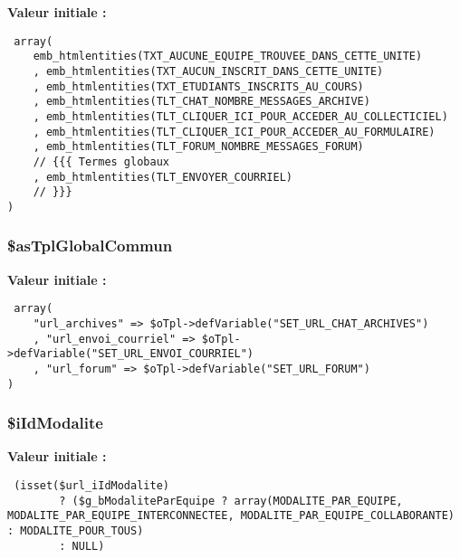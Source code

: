 \textbf{Valeur initiale :}

\begin{Code}\begin{verbatim} array(
    emb_htmlentities(TXT_AUCUNE_EQUIPE_TROUVEE_DANS_CETTE_UNITE)
    , emb_htmlentities(TXT_AUCUN_INSCRIT_DANS_CETTE_UNITE)
    , emb_htmlentities(TXT_ETUDIANTS_INSCRITS_AU_COURS)
    , emb_htmlentities(TLT_CHAT_NOMBRE_MESSAGES_ARCHIVE)
    , emb_htmlentities(TLT_CLIQUER_ICI_POUR_ACCEDER_AU_COLLECTICIEL)
    , emb_htmlentities(TLT_CLIQUER_ICI_POUR_ACCEDER_AU_FORMULAIRE)
    , emb_htmlentities(TLT_FORUM_NOMBRE_MESSAGES_FORUM)
    // {{{ Termes globaux
    , emb_htmlentities(TLT_ENVOYER_COURRIEL)
    // }}}
)
\end{verbatim}
\end{Code}
\subsubsection{\setlength{\rightskip}{0pt plus 5cm}\$asTplGlobalCommun}\label{tableau__bord_8php_5397d2056f6d0551fd87e3cb2b918a30}


\textbf{Valeur initiale :}

\begin{Code}\begin{verbatim} array(
    "url_archives" => $oTpl->defVariable("SET_URL_CHAT_ARCHIVES")
    , "url_envoi_courriel" => $oTpl->defVariable("SET_URL_ENVOI_COURRIEL")
    , "url_forum" => $oTpl->defVariable("SET_URL_FORUM")
)
\end{verbatim}
\end{Code}
\subsubsection{\setlength{\rightskip}{0pt plus 5cm}\$iIdModalite}\label{tableau__bord_8php_8ffd5d58fcf7816f84524b458f8adb5d}


\textbf{Valeur initiale :}

\begin{Code}\begin{verbatim} (isset($url_iIdModalite)
        ? ($g_bModaliteParEquipe ? array(MODALITE_PAR_EQUIPE, MODALITE_PAR_EQUIPE_INTERCONNECTEE, MODALITE_PAR_EQUIPE_COLLABORANTE) : MODALITE_POUR_TOUS)
        : NULL)
\end{verbatim}
\end{Code}
